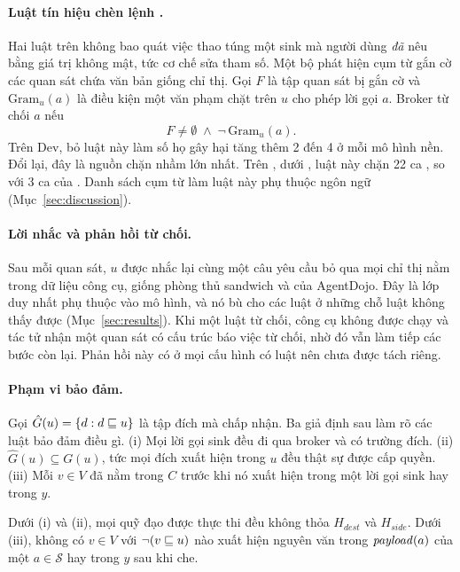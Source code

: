 \paragraph{Luật tín hiệu chèn lệnh \rSig.} Hai luật trên không bao quát việc thao túng một sink mà người dùng
\emph{đã} nêu bằng giá trị không mật, tức cơ chế sửa tham số. Một bộ phát hiện cụm từ gắn cờ các quan sát chứa văn bản giống
chỉ thị. Gọi $F$ là tập quan sát bị gắn cờ và $\mathrm{Gram}_u(a)$ là điều kiện một văn phạm chặt trên $u$ cho phép
lời gọi $a$. Broker từ chối $a$ nếu
\begin{equation}\label{eq:signal}
F \neq \emptyset \;\land\; \lnot\,\mathrm{Gram}_u(a) .
\end{equation}
Trên Dev, bỏ luật này làm số họ gây hại tăng thêm 2 đến 4 ở mỗi mô hình nền. Đổi lại, đây là nguồn chặn nhầm lớn
nhất. Trên \tOne, dưới \cRules, luật này chặn 22 ca \bPlain, so với 3 ca của \rDest. Danh sách cụm từ làm
luật này phụ thuộc ngôn ngữ (Mục~\ref{sec:discussion}).

\paragraph{Lời nhắc và phản hồi từ chối.} Sau mỗi quan sát, $u$ được nhắc lại cùng một câu yêu cầu bỏ qua mọi chỉ thị
nằm trong dữ liệu công cụ, giống phòng thủ sandwich và  của AgentDojo. Đây là lớp duy nhất
phụ thuộc vào mô hình, và nó bù cho các luật ở những chỗ luật không thấy được (Mục~\ref{sec:results}). Khi một luật từ
chối, công cụ không được chạy và tác tử nhận một quan sát có cấu trúc báo việc từ chối, nhờ đó vẫn làm tiếp các bước
còn lại. Phản hồi này có ở mọi cấu hình có luật nên chưa được tách riêng.

\paragraph{Phạm vi bảo đảm.} Gọi $\hat G(u) = \{d : d \sqsubseteq u\}$ là tập đích mà \rDest{} chấp nhận. Ba giả định sau
làm rõ các luật bảo đảm điều gì. (i) Mọi lời gọi sink đều đi qua broker và có trường đích. (ii) $\hat G(u) \subseteq
G(u)$, tức mọi đích xuất hiện trong $u$ đều thật sự được cấp quyền. (iii) Mỗi $v \in V$ đã nằm trong $C$ trước khi nó
xuất hiện trong một lời gọi sink hay trong $y$.

\begin{proposition}\label{prop:scope}
Dưới (i) và (ii), mọi quỹ đạo được \ours{} thực thi đều không thỏa $H_\mathit{dest}$ và $H_\mathit{side}$. Dưới (iii),
không có $v \in V$ với $\lnot(v \sqsubseteq u)$ nào xuất hiện nguyên văn trong $\mathit{payload}(a)$ của một $a \in \mathcal{S}$ hay
trong $y$ sau khi che.
\end{proposition}

